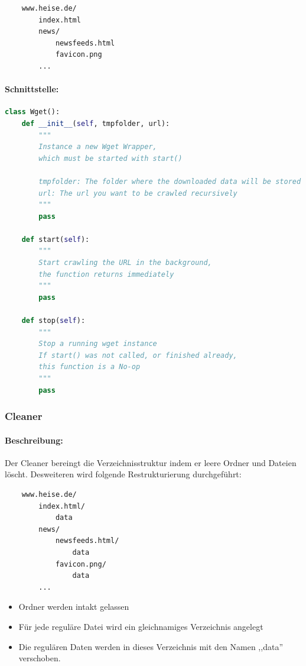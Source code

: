 \begin{verbatim}
    www.heise.de/
        index.html
        news/
            newsfeeds.html
            favicon.png
        ...
\end{verbatim}

\paragraph{Schnittstelle:}
\label{par:schnittstelle_}

\begin{lstlisting}[language=python]
class Wget():
    def __init__(self, tmpfolder, url):
        """
        Instance a new Wget Wrapper,
        which must be started with start()

        tmpfolder: The folder where the downloaded data will be stored
        url: The url you want to be crawled recursively
        """
        pass

    def start(self): 
        """
        Start crawling the URL in the background,
        the function returns immediately
        """
        pass

    def stop(self):
        """
        Stop a running wget instance
        If start() was not called, or finished already,
        this function is a No-op
        """
        pass
\end{lstlisting}


\subsubsection{Cleaner}
\label{ssub:cleaner}
\paragraph{Beschreibung:}
\label{par:beschreibung_}
Der Cleaner bereingt die Verzeichnisstruktur indem er leere Ordner und Dateien löscht.
Desweiteren wird folgende Restrukturierung durchgeführt:
\begin{verbatim}
    www.heise.de/ 
        index.html/
            data
        news/
            newsfeeds.html/
                data
            favicon.png/
                data
        ...
\end{verbatim}


\begin{itemize}
    \item Ordner werden intakt gelassen
    \item Für jede reguläre Datei wird ein gleichnamiges Verzeichnis angelegt
    \item Die regulären Daten werden in dieses Verzeichnis mit den Namen ,,data'' verschoben.
\end{itemize}

